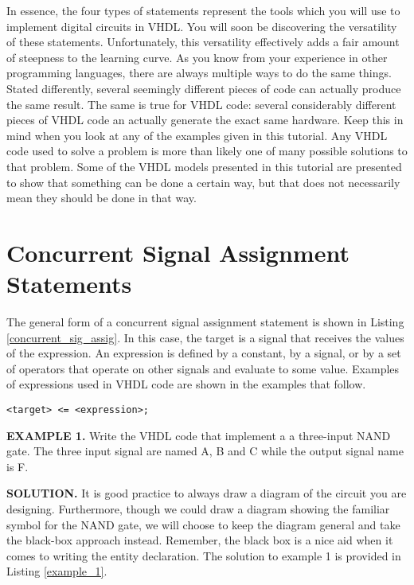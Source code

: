 In essence, the four types of statements represent the tools which you will use to implement digital circuits in VHDL. You will soon be discovering the versatility of these statements. Unfortunately, this versatility effectively adds a fair amount of steepness to the learning curve. As you know from your experience in other programming languages, there are always multiple ways to do the same things. Stated differently, several seemingly different pieces of code can actually produce the same result. The same is true for VHDL code: several considerably different pieces of VHDL code an actually generate the exact same hardware. Keep this in mind when you look at any of the examples given in this tutorial. Any VHDL code used to solve a problem is more than likely one of many possible solutions to that problem. Some of the VHDL models presented in this tutorial are presented to show that something can be done a certain way, but that does not necessarily mean they should be done in that way.

\section{Concurrent Signal Assignment Statements}
The general form of a concurrent signal assignment statement is shown in Listing \ref{concurrent_sig_assig}. In this case, the target is a signal that receives the values of the expression. An expression is defined by a constant, by a signal, or by a set of operators that operate on other signals and evaluate to some value. Examples of expressions used in VHDL code are shown in the examples that follow.

\begin{lstlisting}[label=concurrent_sig_assig, caption=Syntax for the concurrent signal assignment statement.]
<target> <= <expression>;
\end{lstlisting}

\begin{leftbar}
\noindent
\textbf{EXAMPLE 1.}
Write the VHDL code that implement a a three-input NAND gate. The three input signal are named A, B and C while the output signal name is F. 
\end{leftbar}
\noindent
\textbf{SOLUTION.} It is good practice to always draw a diagram of the circuit you are designing. Furthermore, though we could draw a diagram showing the familiar symbol for the NAND gate, we will choose to keep the diagram general and take the black-box approach instead. Remember, the black box is a nice aid when it comes to writing the entity declaration. The solution to example 1 is provided in Listing \ref{example_1}.

